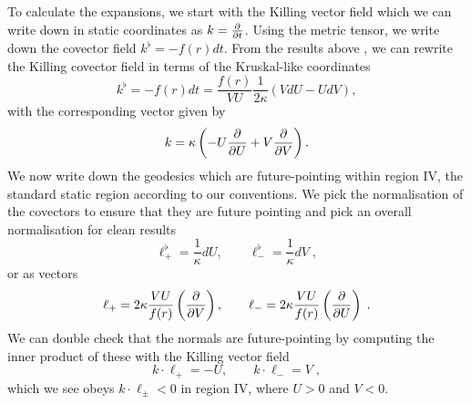 To calculate the expansions, we start with the Killing vector field which we can write down in static coordinates as $k  = \frac{\partial }{\partial t}$. Using the metric tensor, we write down the covector field $k^\flat = -f (r) dt$. From the results above , we can rewrite the Killing covector field in terms of the Kruskal-like coordinates
\begin{equation*}
    k^\flat = - f(r) dt = \frac{f(r)}{V U} \frac{1}{2 \kappa} \left( V dU - U dV \right) ,
\end{equation*}
with the corresponding vector given by 
\begin{equation*}
    k = \kappa \left(- U \frac{\partial }{\partial U} + V \frac{\partial }{\partial V} \right).
\end{equation*}
We now write down the geodesics which are future-pointing within region IV, the standard static region according to our conventions. We pick the normalisation of the covectors to ensure that they are future pointing and pick an overall normalisation for clean results
\begin{equation}
\label{eq:cosnullvec}
    \ell^\flat_{+} = \frac{1}{\kappa} dU, \qquad \ell^\flat_{-} = \frac{1}{\kappa} dV \;,
\end{equation}
or as vectors
\begin{equation*}
    \ell_+ = 2 \kappa \frac{ V U }{f(r)} \left(\frac{\partial }{\partial V} \right), \qquad \ell_- = 2 \kappa \frac{ V U }{f(r)} \left(\frac{\partial }{\partial U} \right) \;.
\end{equation*}
We can double check that the normals are future-pointing by computing the inner product of these with the Killing vector field
\begin{equation*}
    k \cdot \ell_+ = -U, \qquad k \cdot \ell_- = V \;,
\end{equation*}
which we see obeys $k \cdot \ell_\pm < 0$ in region IV, where $U > 0$ and $V < 0$. 

